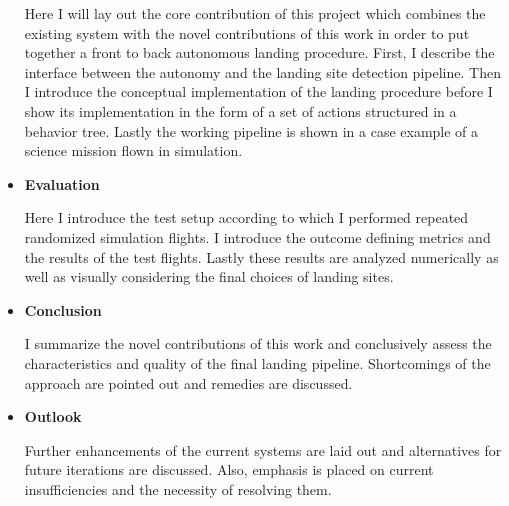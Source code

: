 \begin{itemize}
    Here I will lay out the core contribution of this project which combines the existing system with the novel contributions of this work in order to put together a front to back autonomous landing procedure. First, I describe the interface between the autonomy and the landing site detection pipeline. Then I introduce the conceptual implementation of the landing procedure before I show its implementation in the form of a set of actions structured in a behavior tree. Lastly the working pipeline is shown in a case example of a science mission flown in simulation.
    \item \textbf{Evaluation}

    Here I introduce the test setup according to which I performed repeated randomized simulation flights. I introduce the outcome defining metrics and the results of the test flights. Lastly these results are analyzed numerically as well as visually considering the final choices of landing sites.
    \item \textbf{Conclusion}

    I summarize the novel contributions of this work and conclusively assess the characteristics and quality of the final landing pipeline. Shortcomings of the approach are pointed out and remedies are discussed.

    \item \textbf{Outlook}

    Further enhancements of the current systems are laid out and alternatives for future iterations are discussed. Also, emphasis is placed on current insufficiencies and the necessity of resolving them.
\end{itemize}
